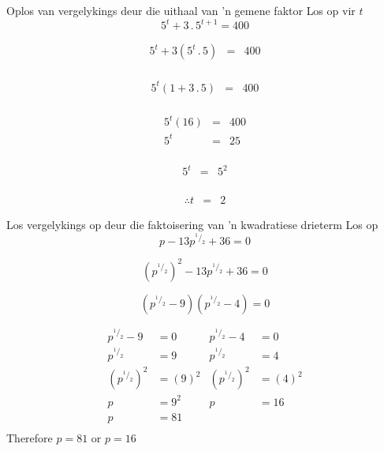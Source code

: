 \begin{wex}
{%
Oplos van vergelykings deur die uithaal van 'n gemene faktor
}
{%
Los op vir $t$
$$ 5^t + 3 \,.\, 5^{t+1} = 400 $$
}
{%

\begin{eqnarray*}
 5^t + 3 ( 5^t \,.\, 5) & = & 400 \\
\end{eqnarray*}

\begin{eqnarray*}
 5^t(1 + 3 \,.\, 5) & = & 400 \\
\end{eqnarray*}



\begin{eqnarray*}
 5^t(16) & = & 400 \\
  5^t & = & 25 \\
\end{eqnarray*}


\begin{eqnarray*}
  5^t & = & 5^2 \\
\end{eqnarray*}


\begin{eqnarray*}
\therefore t & = & 2
\end{eqnarray*}

}
\end{wex}

\begin{wex}
{%
Los vergelykings op deur die faktoisering van 'n kwadratiese drieterm
}
{%
Los op
$$ p-13 p^{^1/_2} + 36 =  0$$
}
{ %


$$ (p^{^1/_2})^2 -13p^{^1/_2} + 36 = 0 $$


$$ (p^{^1/_2} -9)(p^{^1/_2}-4) = 0 $$


\begin{align*}
p^{^1/_2} - 9 &= 0			&   p^{^1/_2} - 4 &= 0		\\
p^{^1/_2} &= 9				&   p^{^1/_2} &= 4		\\		
(p^{^1/_2})^2 &= (9)^2			&   (p^{^1/_2})^2 &= (4)^2\\
p &= 9^2				&   p &= 16\\
p &= 81					&\\
\end{align*} 
Therefore $p=81$ or $p=16$


}
\end{wex}

